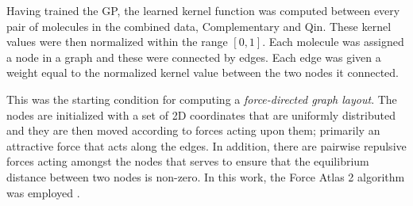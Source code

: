 Having trained the GP, the learned kernel function was computed between every
pair of molecules in the combined data, Complementary and Qin. These kernel values were
then normalized within the range $[0, 1]$. Each molecule was assigned a node in
a graph and these were connected by edges. Each edge was given a weight equal to
the normalized kernel value between the two nodes it connected.

This was the starting condition for computing a \emph{force-directed graph
    layout}. The nodes are initialized with a set of 2D coordinates that are
uniformly distributed and they are then moved according to forces acting upon them;
primarily an attractive force that acts along the edges. In addition, there are
pairwise repulsive forces acting amongst the nodes that serves to ensure that
the equilibrium distance between two nodes is non-zero. In this work, the Force
Atlas 2 algorithm was employed
\cite{jacomyForceAtlas2ContinuousGraph2014,bastianGephiOpenSource2009}.
